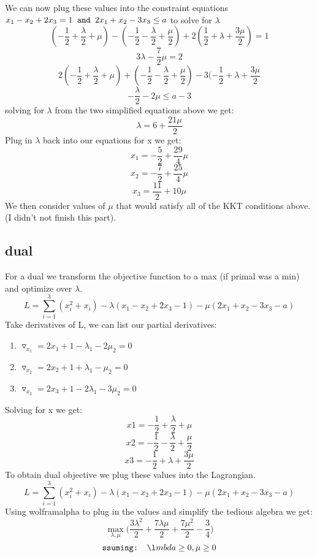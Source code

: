 \documentclass[7pt]{article}
\begin{document}
		We can now plug these values into the constraint equations $x_1-x_2+2x_3=1 \verb| and | 2x_1+x_2-3x_3 \le a$ to solve for $\lambda$
		$$(-\frac{1}{2} +\frac{\lambda}{2}+\mu)-(-\frac{1}{2} -\frac{\lambda}{2}+\frac{\mu}{2})+2(\frac{1}{2} +\lambda+\frac{3\mu}{2} )=1 $$
		$$3\lambda-\frac{7}{2}\mu =2 $$
		$$2(-\frac{1}{2} +\frac{\lambda}{2}+\mu )+(-\frac{1}{2} -\frac{\lambda}{2}+\frac{\mu}{2})-3(-\frac{1}{2} +\lambda+\frac{3\mu}{2}  $$
		$$-\frac{\lambda}{2}-2\mu \le a-3 $$
		solving for $\lambda$ from the two simplified equations above we get:
		$$ \lambda = 6+\frac{21\mu}{2} $$
		Plug in $\lambda$ back into our equations for x we get: 
		$$ x_1 = -\frac{5}{2}+\frac{29}{4}\mu$$
		$$ x_2 = -\frac{7}{2}+\frac{25}{4}\mu$$
		$$ x_3 = \frac{11}{2} +10\mu$$
		We then consider values of $\mu$ that would satisfy all of the KKT conditions above.(I didn't not finish this part).
		\subsection{dual}
		For a dual we transform the objective function to a max (if primal was a min) and optimize over $\lambda$.
			\[ L = \sum_{i=1}^3 (x_i^2+x_i) -\lambda(x_1 -x_2+2x_3-1) - \mu(2x_1+x_2-3x_3-a) \]
			Take derivatives of L, we can list our partial derivatives: 
			\begin{enumerate}
				\item$\triangledown_{x_1} = 2x_1 +1-\lambda_1 -2\mu_2 = 0$ 
				\item$\triangledown_{x_2} = 2x_2 +1 +\lambda_1 -\mu_2 = 0 $
				\item$\triangledown_{x_3} = 2x_3 +1 -2\lambda_1-3\mu_2 = 0 $
			\end{enumerate}
			Solving for x we get: 
				$$ x1 =-\frac{1}{2} +\frac{\lambda}{2}+\mu $$
				$$ x2 =-\frac{1}{2} -\frac{\lambda}{2}+\frac{\mu}{2} $$
				$$ x3 =-\frac{1}{2} +\lambda+\frac{3\mu}{2} $$
				To obtain dual objective we plug these values into the Lagrangian. 
				\[ L = \sum_{i=1}^3 (x_i^2+x_i) -\lambda(x_1 -x_2+2x_3-1) - \mu(2x_1+x_2-3x_3-a) \]
				Using wolframalpha to plug in the values and simplify the tedious algebra we get: 
				$$ \max_{\lambda,\mu} \big(\frac{3\lambda^2}{2}+\frac{7\lambda\mu}{2}+\frac{7\mu^2}{2}-\frac{3}{4}\big)$$
				$$\verb assuming:  \lambda \ge 0 , \mu\ge 0$$
		
\end{document}
